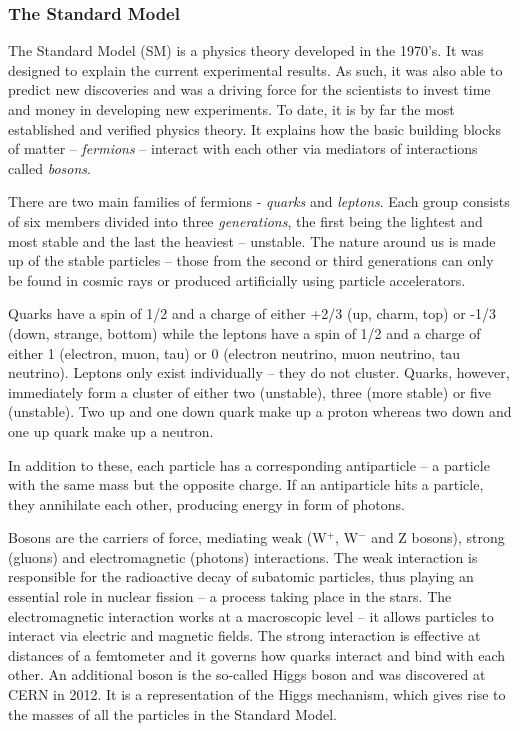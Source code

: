 \documentclass[12pt]{packages/mytustyle}  %
\begin{document}
\subsubsection{The Standard Model}
The Standard Model (SM) is a physics theory developed in the 1970's. It was designed to explain the current experimental results. As such, it was also able to predict new discoveries and was a driving force for the scientists to invest time and money in developing new experiments. To date, it is by far the most established and verified physics theory. It explains how the basic building blocks of matter -- \emph{fermions} -- interact with each other via mediators of interactions called \emph{bosons}.  

There are two main families of fermions - \emph{quarks} and \emph{leptons}. Each group consists of six members divided into three \emph{generations}, the first being the lightest and most stable and the last the heaviest -- unstable. The nature around us is made up of the stable particles -- those from the second or third generations can only be found in cosmic rays or produced artificially using particle accelerators.

Quarks have a spin of 1/2 and a charge of either +2/3 (up, charm, top)  or -1/3  (down, strange, bottom) while the leptons have a spin of 1/2  and a charge of either 1 (electron, muon, tau) or 0 (electron neutrino, muon neutrino, tau neutrino). Leptons only exist individually -- they do not cluster. Quarks, however, immediately form a cluster of either two (unstable), three (more stable) or five (unstable). Two up and one down quark make up a proton whereas two down and one up quark make up a neutron.

In addition to these, each particle has a corresponding antiparticle -- a particle with the same mass but the opposite charge. If an antiparticle hits a particle, they annihilate each other, producing energy in form of photons. 

Bosons are the carriers of force, mediating weak (W$^+$, W$^-$ and Z bosons), strong (gluons) and electromagnetic (photons) interactions. The weak interaction is responsible for the radioactive decay of subatomic particles, thus playing an essential role in nuclear fission -- a process taking place in the stars. The electromagnetic interaction works at a macroscopic level -- it allows particles to interact via electric and magnetic fields. The strong interaction is effective at distances of a femtometer and it governs how quarks interact and bind with each other. An additional boson is the so-called Higgs boson and was discovered at CERN in 2012. It is a representation of the Higgs mechanism, which gives rise to the masses of all the particles in the Standard Model.
\end{document}
